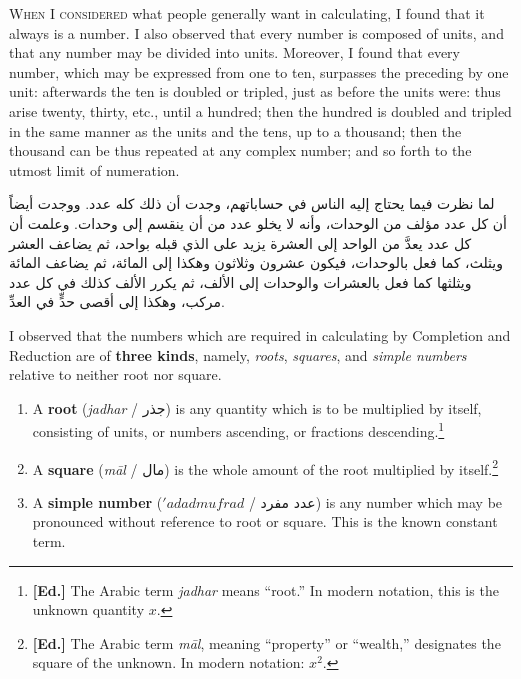 \documentclass[11pt,a4paper,openany,oneside]{book}
\newcommand{\editornote}[1]{\footnote{\textcolor{notecolor}{\textbf{[Ed.]} #1}}}
\newcommand{\ar}[1]{{\arabicfont\beginR #1\endR}}
\begin{document}
\lettrine[lines=3, lhang=0.33, nindent=0em, findent=3pt]{
\textcolor{dropgold}{W}}{hen I considered} what people generally want in calculating, I found
that it always is a number. I also observed that every number is composed of
units, and that any number may be divided into units. Moreover, I found that
every number, which may be expressed from one to ten, surpasses the preceding
by one unit: afterwards the ten is doubled or tripled, just as before the
units were: thus arise twenty, thirty, etc., until a hundred; then the hundred
is doubled and tripled in the same manner as the units and the tens, up to a
thousand; then the thousand can be thus repeated at any complex number; and so
forth to the utmost limit of numeration.

\begin{arabicbox}
\begin{Arabic}
لما نظرت فيما يحتاج إليه الناس في حساباتهم، وجدت أن ذلك كله
عدد. ووجدت أيضاً أن كل عدد مؤلف من الوحدات، وأنه لا يخلو
عدد من أن ينقسم إلى وحدات. وعلمت أن كل عدد يعدَّ من الواحد
إلى العشرة يزيد على الذي قبله بواحد، ثم يضاعف العشر ويثلث،
كما فعل بالوحدات، فيكون عشرون وثلاثون وهكذا إلى المائة،
ثم يضاعف المائة ويثلثها كما فعل بالعشرات والوحدات إلى
الألف، ثم يكرر الألف كذلك في كل عدد مركب، وهكذا إلى
أقصى حدٍّ في العدِّ.
\end{Arabic}
\end{arabicbox}

I observed that the numbers which are required in calculating by Completion
and Reduction are of \textbf{three kinds}, namely, \textit{roots}, \textit{squares},
and \textit{simple numbers} relative to neither root nor square.

\begin{mathbox}[title={\textbf{The Three Kinds of Numbers}}]
\begin{enumerate}[label=\arabic*.,leftmargin=2em]
  \item A \textbf{root} (\textit{jadhar} / \ar{جذر}) is any quantity which is to be
  multiplied by itself, consisting of units, or numbers ascending, or
  fractions descending.\editornote{The Arabic term \textit{jadhar} means
  ``root.'' In modern notation, this is the unknown quantity $x$.}
  
  \item A \textbf{square} (\textit{māl} / \ar{مال}) is the whole amount of the root
  multiplied by itself.\editornote{The Arabic term \textit{māl}, meaning
  ``property'' or ``wealth,'' designates the square of the unknown. In modern
  notation: $x^2$.}
  
  \item A \textbf{simple number} ($'adad mufrad$ / \ar{عدد مفرد}) is any number
  which may be pronounced without reference to root or square. This is the
  known constant term.
\end{enumerate}
\end{mathbox}
\end{document}
